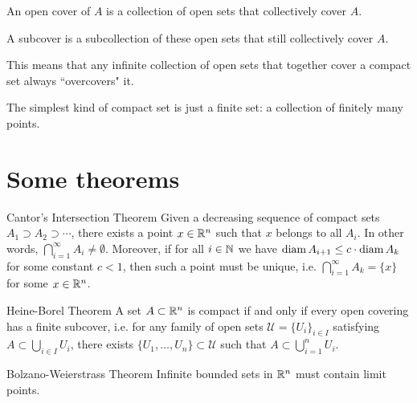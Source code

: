 An open cover of $A$ is a collection of open sets that collectively cover $A$.

A subcover is a subcollection of these open sets that still collectively cover $A$.

This means that any infinite collection of open sets that together cover a compact set always ``overcovers" it.

The simplest kind of compact set is just a finite set: a collection of finitely many points.

\pagebreak

\section{Some theorems}
\begin{thrm}{Cantor's Intersection Theorem}{}
Given a decreasing sequence of compact sets $A_1\supset A_2 \supset \cdots$, there exists a point $x\in\mathbb R^n$ such that $x$ belongs to all $A_i$. In other words, $\bigcap_{i=1}^\infty A_i\neq\emptyset$. Moreover, if for all $i\in\mathbb N$ we have $\operatorname{diam} A_{i+1}\le c\cdot\operatorname{diam} A_k$ for some constant $c<1$, then such a point must be unique, i.e. $\bigcap_{i=1}^\infty A_k=\{x\}$ for some $x\in\mathbb R^n$.
\end{thrm}

\begin{thrm}{Heine-Borel Theorem}{}
A set $A\subset\mathbb R^n$ is compact if and only if every open covering has a finite subcover, i.e. for any family of open sets $\mathscr{U}=\{U_i\}_{i\in I}$ satisfying $A\subset\bigcup_{i\in I}U_i$, there exists $\{U_1,\dots,U_n\}\subset\mathscr{U}$ such that $A\subset\bigcup_{i=1}^n U_i$.
\end{thrm}

\begin{thrm}{Bolzano-Weierstrass Theorem}{}
Infinite bounded sets in $\mathbb R^n$ must contain limit points.
\end{thrm}

